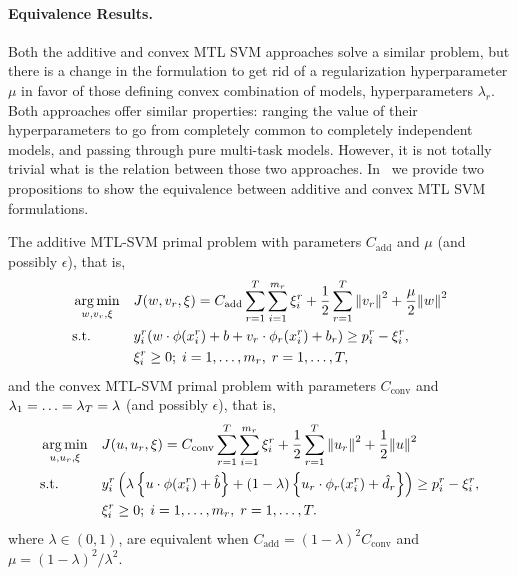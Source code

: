 \paragraph*{Equivalence Results.\\}
Both the {additive} and {convex} MTL SVM approaches solve a similar problem, but there is a change in the formulation to get rid of a regularization hyperparameter $\mu$ in favor of those defining convex combination of models, hyperparameters $\lambda_r$.
Both approaches offer similar properties: ranging the value of their hyperparameters to go from completely common to completely independent models, and passing through pure multi-task models.
However, it is not totally trivial what is the relation between those two approaches.
In~\cite{RuizAD19} we provide two propositions to show the equivalence between {additive} and {convex} MTL SVM formulations.
\begin{prop}\label{prop:add_conv_equiv}
    The {additive} MTL-SVM primal problem with parameters $C_\text{add}$ and $\mu$ (and possibly $\epsilon$), that is,
    \begin{equation}\label{eq:svmmtl_primal_add_equiv}
        \begin{aligned}
        & \argmin_{w, {v}_r, \xi}
        & & {J({w}, {v}_r, \xi) = C_\text{add} \sum_{r= 1}^T \sum_{i=1}^{m_r} {\xi_{i}^r} + \frac{1}{2} \sum_{r= 1}^T{\norm{{v}_r}^2} + \frac{\mu}{2} {\norm{{w}}}^2} \\
        & \text{s.t.}
        & & y_{i}^r ({w} \cdot \phi(x_{i}^r) + b  + {v}_r \cdot \phi_r(x_{i}^r) + b_r) \geq p_{i}^r - \xi_{i}^r ,  \\
        & & & \xi_{i}^r \geq 0; \;  i=1 , \dotsc , m_r, \;  r= 1,\dotsc, T  , \\
        \end{aligned}
    \end{equation}
    and the {convex} MTL-SVM primal problem with parameters $C_\text{conv}$ and $\lambda_1=\ldots=\lambda_T = \lambda$ (and possibly $\epsilon$), that is,
    \begin{equation}\label{eq:svmmtl_primal_convex_equiv}
        \begin{aligned}
        & \argmin_{u, {u}_r, \xi}
        & & {J({u}, {u}_r, \xi) = C_\text{conv} \sum_{r= 1}^T \sum_{i=1}^{m_r} {\xi_{i}^r} + \frac{1}{2} \sum_{r= 1}^T{\norm{{u}_r}^2} + \frac{1}{2} {\norm{{u}}}^2} \\
        & \text{s.t.}
        & & y_{i}^r \left(\lambda \left\lbrace {u} \cdot \phi(x_{i}^r) + \hat{b} \right\rbrace + (1 - \lambda) \left\lbrace {u}_r \cdot \phi_r(x_{i}^r) + \hat{d}_r \right\rbrace  \right) \geq p_{i}^r - \xi_{i}^r ,  \\
        & & & \xi_{i}^r \geq 0; \;  i=1 , \dotsc , m_r, \;  r= 1,\dotsc, T  . \\
        \end{aligned}
    \end{equation}
    where $\lambda \in (0, 1)$, are equivalent when $C_\text{add} = (1 - \lambda)^2 C_\text{conv}$ and $\mu = (1 - \lambda)^2 / \lambda^2$.
    \label{thm_equiv}
\end{prop}
